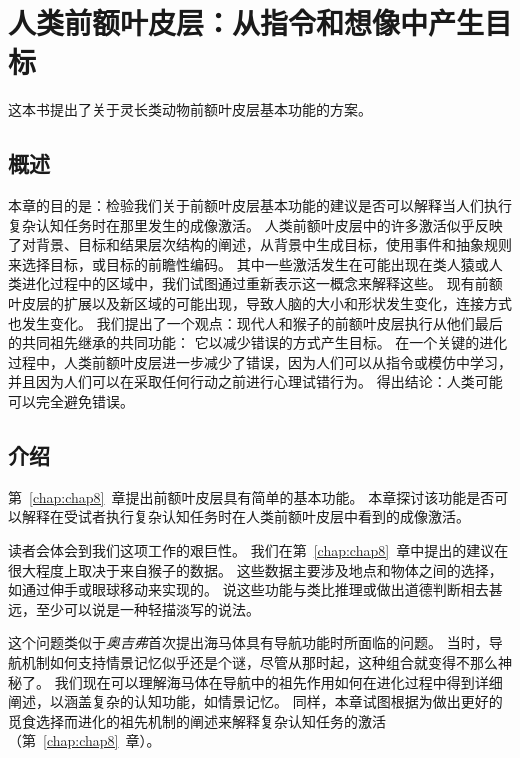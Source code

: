 \chapter{人类前额叶皮层：从指令和想像中产生目标} \label{chap:chap9}

这本书提出了关于灵长类动物前额叶皮层基本功能的方案。


\section{概述}

本章的目的是：检验我们关于前额叶皮层基本功能的建议是否可以解释当人们执行复杂认知任务时在那里发生的成像激活。
人类前额叶皮层中的许多激活似乎反映了对背景、目标和结果层次结构的阐述，从背景中生成目标，使用事件和抽象规则来选择目标，或目标的前瞻性编码。
其中一些激活发生在可能出现在类人猿或人类进化过程中的区域中，我们试图通过重新表示这一概念来解释这些。
现有前额叶皮层的扩展以及新区域的可能出现，导致人脑的大小和形状发生变化，连接方式也发生变化。
我们提出了一个观点：现代人和猴子的前额叶皮层执行从他们最后的共同祖先继承的共同功能：
它以减少错误的方式产生目标。
在一个关键的进化过程中，人类前额叶皮层进一步减少了错误，因为人们可以从指令或模仿中学习，并且因为人们可以在采取任何行动之前进行心理试错行为。
得出结论：人类可能可以完全避免错误。



\section{介绍}

第~\ref{chap:chap8}~章提出前额叶皮层具有简单的基本功能。
本章探讨该功能是否可以解释在受试者执行复杂认知任务时在人类前额叶皮层中看到的成像激活。
\par


读者会体会到我们这项工作的艰巨性。
我们在第~\ref{chap:chap8}~章中提出的建议在很大程度上取决于来自猴子的数据。
这些数据主要涉及地点和物体之间的选择，如通过伸手或眼球移动来实现的。
说这些功能与类比推理或做出道德判断相去甚远，至少可以说是一种轻描淡写的说法。
\par


这个问题类似于\textit{奥吉弗}首次提出海马体具有导航功能时所面临的问题\cite{nadel1980hippocampus}。
当时，导航机制如何支持情景记忆似乎还是个谜，尽管从那时起，这种组合就变得不那么神秘了\cite{burgess2002human}。
我们现在可以理解海马体在导航中的祖先作用如何在进化过程中得到详细阐述，以涵盖复杂的认知功能，如情景记忆。
同样，本章试图根据为做出更好的觅食选择而进化的祖先机制的阐述来解释复杂认知任务的激活（第~\ref{chap:chap8}~章）。
\par


